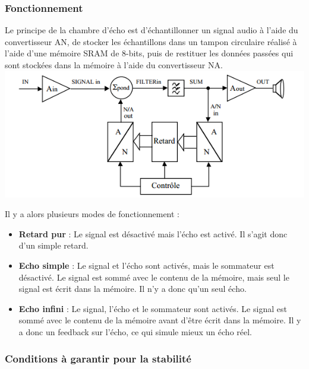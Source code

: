 \documentclass{article}
\begin{document}
\subsubsection{Fonctionnement}
Le principe de la chambre d'écho est d'échantillonner un signal audio à l'aide du convertisseur AN, de stocker les échantillons dans un tampon circulaire réalisé à l'aide d'une mémoire SRAM de 8-bits, puis de restituer les données passées qui sont stockées dans la mémoire à l'aide du convertisseur NA.\\
\includegraphics{principe_chambre_d'echo.png}

Il y a alors plusieurs modes de fonctionnement :
\begin{itemize}
\item \textbf{Retard pur} : Le signal est désactivé mais l'écho est activé. Il s'agit donc d'un simple retard.
\item \textbf{Echo simple} : Le signal et l'écho sont activés, mais le sommateur est désactivé. Le signal est sommé avec le contenu de la mémoire, mais seul le signal est écrit dans la mémoire. Il n'y a donc qu'un seul écho.
\item \textbf{Echo infini} : Le signal, l'écho et le sommateur sont activés. Le signal est sommé avec le contenu de la mémoire avant d'être écrit dans la mémoire. Il y a donc un feedback sur l'écho, ce qui simule mieux un écho réel.
\end{itemize}

\subsubsection{Conditions à garantir pour la stabilité}
\end{document}
